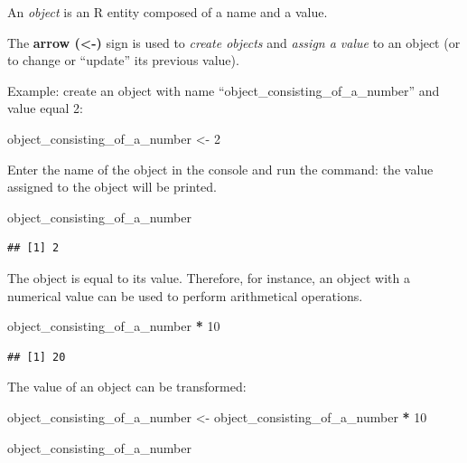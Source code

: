 \documentclass[
]{article}
\newenvironment{Shaded}{\begin{snugshade}}{\end{snugshade}}
\newcommand{\DecValTok}[1]{\textcolor[rgb]{0.00,0.00,0.81}{#1}}
\newcommand{\NormalTok}[1]{#1}
\newcommand{\OperatorTok}[1]{\textcolor[rgb]{0.81,0.36,0.00}{\textbf{#1}}}
\newcommand{\StringTok}[1]{\textcolor[rgb]{0.31,0.60,0.02}{#1}}
\begin{document}
An \emph{object} is an R entity composed of a name and a value.

The \textbf{arrow (\textless-)} sign is used to \emph{create objects} and \emph{assign a value} to an object (or to change or ``update'' its previous value).

Example: create an object with name ``object\_consisting\_of\_a\_number'' and value equal 2:

\begin{Shaded}
\begin{Highlighting}[]
\NormalTok{object_consisting_of_a_number <-}\StringTok{ }\DecValTok{2}
\end{Highlighting}
\end{Shaded}

Enter the name of the object in the console and run the command: the value assigned to the object will be printed.

\begin{Shaded}
\begin{Highlighting}[]
\NormalTok{object_consisting_of_a_number}
\end{Highlighting}
\end{Shaded}

\begin{verbatim}
## [1] 2
\end{verbatim}

The object is equal to its value. Therefore, for instance, an object with a numerical value can be used to perform arithmetical operations.

\begin{Shaded}
\begin{Highlighting}[]
\NormalTok{object_consisting_of_a_number }\OperatorTok{*}\StringTok{ }\DecValTok{10}
\end{Highlighting}
\end{Shaded}

\begin{verbatim}
## [1] 20
\end{verbatim}

The value of an object can be transformed:

\begin{Shaded}
\begin{Highlighting}[]
\NormalTok{object_consisting_of_a_number <-}\StringTok{ }\NormalTok{object_consisting_of_a_number }\OperatorTok{*}\StringTok{ }\DecValTok{10}

\NormalTok{object_consisting_of_a_number}
\end{Highlighting}
\end{Shaded}
\end{document}
